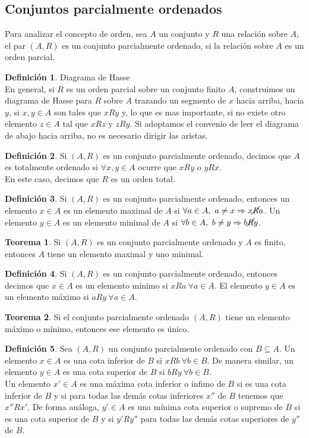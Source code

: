 \documentclass[10pt]{article}
\theoremstyle{definition}
\newtheorem{definition}{Definición}[section]
\newtheorem{theorem}{Teorema}[section]
\begin{document}
\subsection{Conjuntos parcialmente ordenados}
Para analizar el concepto de orden, sea $A$ un conjunto y $R$ una relación sobre $A$, el par $(A,R)$ es un conjunto parcialmente ordenado, si la relación sobre $A$ es un orden parcial.
\begin{definition}{Diagrama de Hasse}
	\\En general, si $R$ es un orden parcial sobre un conjunto finito $A$, construimos un diagrama de Hasse para $R$ sobre $A$ trazando un segmento de $x$ hacia arriba, hacia $y$, si $x,y\in A$ son tales que $xRy$ y, lo que es mas importante, si no existe otro elemento $z\in A$ tal que $xRz$ y $zRy$. Si adoptamos el convenio de leer el diagrama de abajo hacia arriba, no es necesario dirigir las aristas.
\end{definition}
\begin{definition}
	Si $(A,R)$ es un conjunto parcialmente ordenado, decimos que $A$ es totalmente ordenado si $\forall x,y\in A$ ocurre que $xRy$ o $yRx$.\\
	En este caso, decimos que $R$ es un orden total.
\end{definition}
\begin{definition}
	Si $(A,R)$ es un conjunto parcialmente ordenado, entonces un elemento $x\in A$ es un elemento maximal de $A$ si $\forall a\in A,\ a\neq x\Rightarrow x\cancel{R}a$. Un elemento $y\in A$ es un elemento minimal de $A$ si $\forall b\in A,\ b\neq y\Rightarrow b\cancel{R}y$.
\end{definition}
\begin{theorem}
	Si $(A,R)$ es un conjunto parcialmente ordenado y $A$ es finito, entonces $A$ tiene un elemento maximal y uno minimal.
\end{theorem}
\begin{definition}
	Si $(A,R)$ es un conjunto parcialmente ordenado, entonces decimos que $x\in A$ es un elemento mínimo si $xRa\ \forall a\in A$. El elemento $y\in A$ es un elemento máximo si $aRy\ \forall a\in A$.
\end{definition}
\begin{theorem}
	Si el conjunto parcialmente ordenado $(A,R)$ tiene un elemento máximo o mínimo, entonces ese elemento es único.
\end{theorem}
\begin{definition}
	Sea $(A,R)$ un conjunto parcialmente ordenado con $B\subseteq A$. Un elemento $x\in A$ es una cota inferior de $B$ si $xRb\ \forall b\in B$. De manera similar, un elemento $y\in A$ es una cota superior de $B$ si $bRy\ \forall b\in B$.\\
	Un elemento $x'\in A$ es una máxima cota inferior o ínfimo de $B$ si es una cota inferior de $B$ y si para todas las demás cotas inferiores $x''$ de $B$ tenemos que $x''Rx'$. De forma análoga, $y'\in A$ es una mínima cota superior o supremo de $B$ si es una cota superior de $B$ y si $y'Ry''$ para todas las demás cotas superiores de $y''$ de $B$.
\end{definition}
\end{document}
